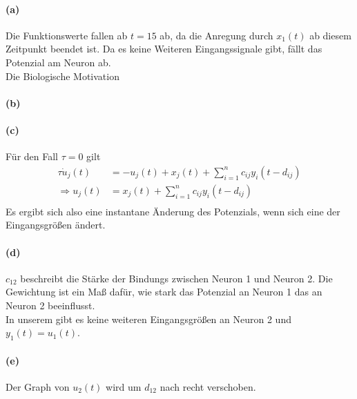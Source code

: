 \documentclass[a4paper]{article}
\begin{document}
\paragraph{(a)}
Die Funktionswerte fallen ab $t=15$ ab, da die Anregung durch $x_1(t)$ ab diesem Zeitpunkt beendet ist. Da es keine Weiteren Eingangssignale gibt, fällt das Potenzial am Neuron ab.\\
Die Biologische Motivation

\paragraph{(b)}


\paragraph{(c)}
Für den Fall $\tau=0$ gilt
\begin{align*}
    \tau \dot{u}_j(t)&=-u_j(t)+x_j(t)+\sum_{i=1}^n c_{ij}y_i(t-d_{ij})\\
    \Rightarrow u_j(t)&=x_j(t)+\sum_{i=1}^n c_{ij}y_i(t-d_{ij})\\
\end{align*}
Es ergibt sich also eine instantane Änderung des Potenzials, wenn sich eine der Eingangsgrößen ändert.

\paragraph{(d)}
$c_{12}$ beschreibt die Stärke der Bindungs zwischen Neuron 1 und Neuron 2. Die Gewichtung ist ein Maß dafür, wie stark das Potenzial an Neuron 1 das an Neuron 2 beeinflusst.\\
In unserem gibt es keine weiteren Eingangsgrößen an Neuron 2 und $y_1(t)=u_1(t)$. 

\paragraph{(e)}
Der Graph von $u_2(t)$ wird um $d_{12}$ nach recht verschoben.
\end{document}
